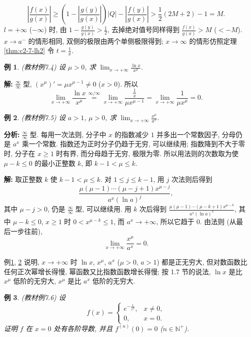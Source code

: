\documentclass[UTF8,openany]{ctexbook}
\theoremstyle{chinesetextbook}
\newtheorem{example}{例}[section]
\newenvironment{cnsolution}{\par\indent\textbf{解:} \ignorespaces}{\par}
\begin{document}
\[
\left|\frac{f(x)}{g(x)}\right|\ge\left(1-\left|\frac{g(y)}{g(x)}\right|\right)|Q|-\left|\frac{f(y)}{g(x)}\right|>\frac12(2M+2)-1=M.
\]
$l=+\infty$ ($-\infty$) 时, 由 $\displaystyle1-\frac{g(y)}{g(x)}>\frac12$, 去掉绝对值号同样得到 $\displaystyle\frac{f(x)}{g(x)}>M$ ($<-M$). $x\to a^-$ 的情形相同, 双侧的极限由两个单侧极限得到; $x\to\infty$ 的情形仿照定理\ref{thm:c2-7-lh2} 令 $\displaystyle t=\frac1x$.
\begin{example}\label{ex:c2-7-4}
\textnormal{(教材例7.4)} 设 $\mu>0$, 求 $\displaystyle\lim_{x\to+\infty}\frac{\ln x}{x^\mu}$.
\end{example}
\begin{cnsolution}
$\displaystyle\frac\infty\infty$ 型, $(x^\mu)'=\mu x^{\mu-1}\ne0$ ($x>0$). 所以
\[
\lim_{x\to+\infty}\frac{\ln x}{x^\mu}\overset{\infty/\infty}{=}\lim_{x\to+\infty}\frac{\frac1x}{\mu x^{\mu-1}}=\lim_{x\to+\infty}\frac1{\mu x^\mu}=0.
\]
\end{cnsolution}
\begin{example}\label{ex:c2-7-5}
\textnormal{(教材例7.5)} 设 $a>1$, $\mu>0$, 求 $\displaystyle\lim_{x\to+\infty}\frac{x^\mu}{a^x}$.
\end{example}
\par\indent\textbf{分析:} $\displaystyle\frac\infty\infty$ 型. 每用一次法则, 分子中 $x$ 的指数减少 $1$ 并多出一个常数因子, 分母仍是 $a^x$ 乘一个常数. 指数还为正时分子仍趋于无穷, 可以继续用; 指数降到不大于零时, 分子在 $x\ge1$ 时有界, 而分母趋于无穷, 极限为零. 所以用法则的次数取为使 $\mu-k\le0$ 的最小正整数 $k$, 即 $k-1<\mu\le k$.
\begin{cnsolution}
取正整数 $k$ 使 $k-1<\mu\le k$. 对 $1\le j\le k-1$, 用 $j$ 次法则后得到
\[
\frac{\mu(\mu-1)\cdots(\mu-j+1)x^{\mu-j}}{a^x(\ln a)^j},
\]
其中 $\mu-j>0$, 仍是 $\displaystyle\frac\infty\infty$ 型, 可以继续用. 用 $k$ 次后得到 $\displaystyle\frac{\mu(\mu-1)\cdots(\mu-k+1)x^{\mu-k}}{a^x(\ln a)^k}$, 其中 $\mu-k\le0$, $x\ge1$ 时 $0<x^{\mu-k}\le1$, 而 $a^x\to+\infty$, 所以它趋于 $0$. 由法则 (从最后一步往前),
\[
\lim_{x\to+\infty}\frac{x^\mu}{a^x}=0.
\]
\end{cnsolution}
例\ref{ex:c2-7-4}, \ref{ex:c2-7-5} 说明, $x\to+\infty$ 时 $\ln x$, $x^\mu$, $a^x$ ($\mu>0$, $a>1$) 都是正无穷大, 但对数函数比任何正次幂增长得慢, 幂函数又比指数函数增长得慢; 按 1.7 节的说法, $\ln x$ 是比 $x^\mu$ 低阶的无穷大, $x^\mu$ 是比 $a^x$ 低阶的无穷大.
\begin{example}\label{ex:c2-7-6}
\textnormal{(教材例7.6)} 设
\[
f(x)=\begin{cases}e^{-\frac1{x^2}},&x\ne0,\\0,&x=0.\end{cases}
\]
证明 $f$ 在 $x=0$ 处有各阶导数, 并且 $f^{(n)}(0)=0$ ($n\in\mathbb N^+$).
\end{example}
\end{document}
